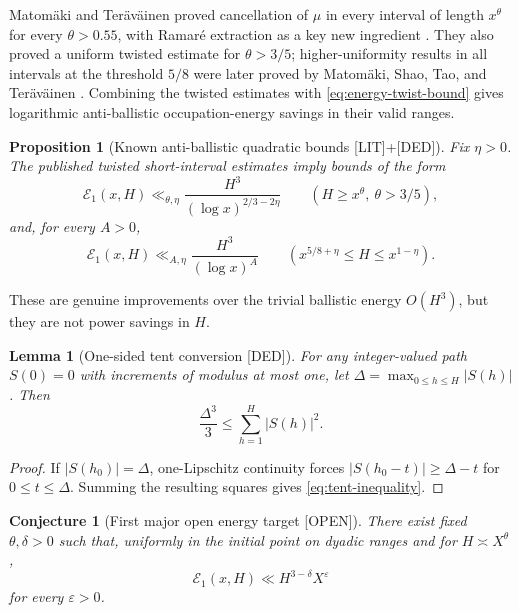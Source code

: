 \documentclass[11pt]{amsart}
\numberwithin{equation}{section}
\theoremstyle{plain}
\newtheorem{proposition}[theorem]{Proposition}
\newtheorem{lemma}[theorem]{Lemma}
\newtheorem{conjecture}[theorem]{Conjecture}
\theoremstyle{definition}
\theoremstyle{remark}
\newcommand{\Mob}{\mu}
\newcommand{\eps}{\varepsilon}
\newcommand{\LIT}{\textup{[LIT]}}
\newcommand{\DED}{\textup{[DED]}}
\newcommand{\OPEN}{\textup{[OPEN]}}
\begin{document}
Matom\"aki and Ter\"av\"ainen proved cancellation of $\Mob$ in every interval of length
$x^\theta$ for every $\theta>0.55$, with Ramar\'e extraction as a key new ingredient
\cite{MatomakiTeravainen2023}.  They also proved a uniform twisted estimate for
$\theta>3/5$; higher-uniformity results in all intervals at the threshold $5/8$ were later
proved by Matom\"aki, Shao, Tao, and Ter\"av\"ainen \cite{MatomakiShaoTaoTeravainen2023}.
Combining the twisted estimates with \eqref{eq:energy-twist-bound} gives logarithmic
anti-ballistic occupation-energy savings in their valid ranges.

\begin{proposition}[Known anti-ballistic quadratic bounds \LIT+\DED]
\label{prop:known-antiballistic}
Fix $\eta>0$.  The published twisted short-interval estimates imply bounds of the form
\begin{equation}
\mathcal E_1(x,H)
\ll_{\theta,\eta}
\frac{H^3}{(\log x)^{2/3-2\eta}}
\qquad(H\ge x^\theta,\ \theta>3/5),
\label{eq:known-log-energy}
\end{equation}
and, for every $A>0$,
\begin{equation}
\mathcal E_1(x,H)
\ll_{A,\eta}
\frac{H^3}{(\log x)^A}
\qquad(x^{5/8+\eta}\le H\le x^{1-\eta}).
\label{eq:known-arbitrary-log-energy}
\end{equation}
\end{proposition}

These are genuine improvements over the trivial ballistic energy $O(H^3)$, but they are not power
savings in $H$.

\begin{lemma}[One-sided tent conversion \DED]
\label{lem:tent}
For any integer-valued path $S(0)=0$ with increments of modulus at most one, let
$\Delta=\max_{0\le h\le H}|S(h)|$.  Then
\begin{equation}
\frac{\Delta^3}{3}
\le
\sum_{h=1}^{H}|S(h)|^2.
\label{eq:tent-inequality}
\end{equation}
\end{lemma}

\begin{proof}
If $|S(h_0)|=\Delta$, one-Lipschitz continuity forces
$|S(h_0-t)|\ge\Delta-t$ for $0\le t\le\Delta$.  Summing the resulting squares gives
\eqref{eq:tent-inequality}.
\end{proof}

\begin{conjecture}[First major open energy target \OPEN]
\label{conj:first-power-saving}
There exist fixed $\theta,\delta>0$ such that, uniformly in the initial point on dyadic ranges and
for $H\asymp X^\theta$,
\begin{equation}
\mathcal E_1(x,H)\ll H^{3-\delta}X^\eps
\label{eq:first-power-saving}
\end{equation}
for every $\eps>0$.
\end{conjecture}
\end{document}
